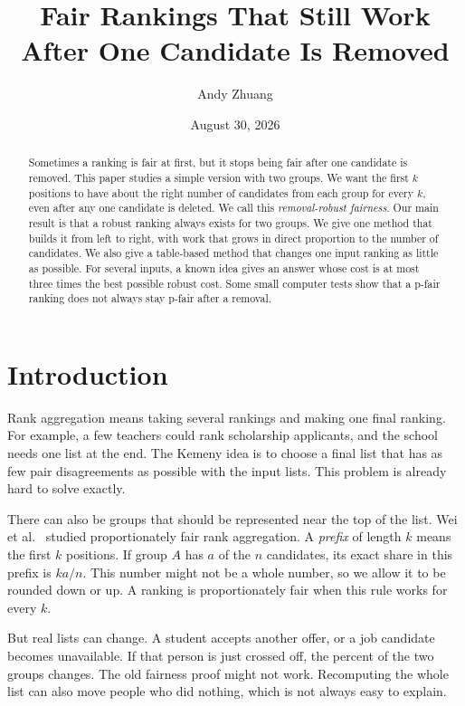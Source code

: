 \documentclass[11pt]{article}
\title{\textbf{Fair Rankings That Still Work After One Candidate Is Removed}\\
\large}
\author{Andy Zhuang}
\date{August 30, 2026}
\begin{document}
\maketitle

\begin{abstract}
Sometimes a ranking is fair at first, but it stops being fair after one
candidate is removed.  This paper studies a simple version with two groups.
We want the first $k$ positions to have about the right number of candidates
from each group for every $k$, even after any one candidate is deleted.  We
call this \emph{removal-robust fairness}.  Our main result is that a robust
ranking always exists for two groups.  We give one method that builds it from
left to right, with work that grows in direct proportion to the number of
candidates.  We also give a table-based method that changes one input ranking
as little as possible.  For several inputs, a known idea gives an answer whose
cost is at most three times the best possible robust cost.  Some small computer
tests show that a p-fair ranking does not always stay p-fair after a removal.
\end{abstract}

\section{Introduction}

Rank aggregation means taking several rankings and making one final ranking.
For example, a few teachers could rank scholarship applicants, and the school
needs one list at the end.  The Kemeny idea is to choose a final list that has
as few pair disagreements as possible with the input lists.  This problem is
already hard to solve exactly.

There can also be groups that should be represented near the top of the list.
Wei et al.~\cite{wei2022} studied proportionately fair rank aggregation.  A
\emph{prefix} of length $k$ means the first $k$ positions.  If group $A$ has
$a$ of the $n$ candidates, its exact share in this prefix is $ka/n$.  This
number might not be a whole number, so we allow it to be rounded down or up.
A ranking is proportionately fair when this rule works for every $k$.

But real lists can change.  A student accepts another offer, or a job
candidate becomes unavailable.  If that person is just crossed off, the
percent of the two groups changes.  The old fairness proof might not work.
Recomputing the whole list can also move people who did nothing, which is not
always easy to explain.
\end{document}

